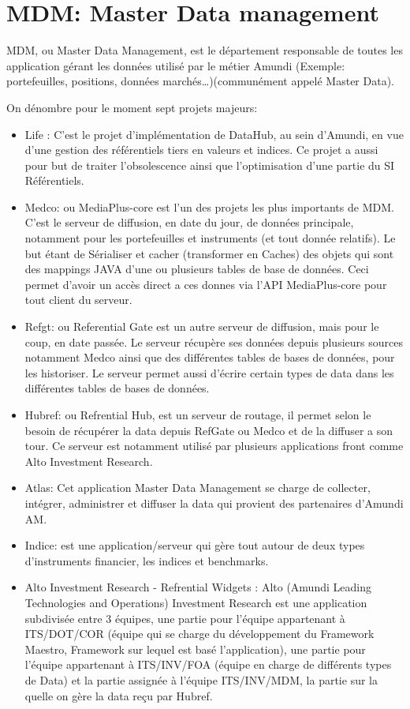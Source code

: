 \section{MDM: Master Data management}
\par MDM, ou Master Data Management, est le département responsable de toutes les application gérant les données utilisé par le métier Amundi (Exemple: portefeuilles, positions, données marchés\dots)(communément appelé Master Data).
\par On dénombre pour le moment sept projets majeurs:
\begin{itemize}
    \item Life : C'est le projet d'implémentation de DataHub, au sein d'Amundi, en vue d'une gestion des référentiels tiers en valeurs et indices. Ce projet a aussi pour but de traiter l’obsolescence ainsi que l'optimisation d’une partie du SI Référentiels.
    \item Medco: ou MediaPlus-core est l'un des projets les plus importants de MDM. C'est le serveur de diffusion, en date du jour, de données principale, notamment pour les portefeuilles et instruments (et tout donnée relatifs). Le but étant de Sérialiser et cacher (transformer en Caches) des objets qui sont des mappings JAVA d'une ou plusieurs tables de base de données. Ceci permet d'avoir un accès direct a ces donnes via l'API MediaPlus-core pour tout client du serveur.
    \item Refgt: ou Referential Gate est un autre serveur de diffusion, mais pour le coup, en date passée. Le serveur récupère ses données depuis plusieurs sources notamment Medco ainsi que des différentes tables de bases de données, pour les historiser. Le serveur permet aussi d'écrire certain types de data dans les différentes tables de bases de données. 
    \item Hubref: ou Refrential Hub, est un serveur de routage, il permet selon le besoin de récupérer la data depuis RefGate ou Medco et de la diffuser a son tour. Ce serveur est notamment utilisé par plusieurs applications front comme Alto Investment Research.
    \item Atlas: Cet application Master Data Management se charge de collecter, intégrer, administrer et diffuser la data qui provient des partenaires d'Amundi AM.
    \item Indice: est une application/serveur qui gère tout autour de deux types d'instruments financier, les indices et benchmarks. 
    \item Alto Investment Research - Refrential Widgets : Alto (Amundi Leading Technologies and Operations) Investment Research est une application subdivisée entre 3 équipes, une partie pour l'équipe appartenant à ITS/DOT/COR (équipe qui se charge du développement du Framework Maestro, Framework sur lequel est basé l'application), une partie pour l'équipe appartenant à ITS/INV/FOA (équipe en charge de différents types de Data) et la partie assignée à l'équipe ITS/INV/MDM, la partie sur la quelle on gère la data reçu par Hubref.
\end{itemize}

